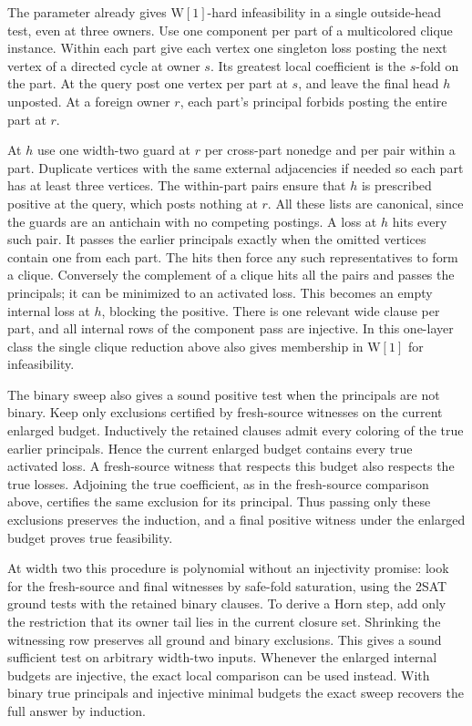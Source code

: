 The parameter already gives $\mathrm W[1]$-hard
infeasibility in a single outside-head test,
even at three owners. Use one component per
part of a multicolored clique instance. Within
each part give each vertex one singleton loss
posting the next vertex of a directed cycle at
owner $s$. Its greatest local coefficient is
the $s$-fold on the part. At the query post one
vertex per part at $s$, and leave the final head
$h$ unposted. At a foreign owner $r$, each part's
principal forbids posting the entire part at $r$.

At $h$ use one width-two guard at $r$ per cross-part
nonedge and per pair within a part. Duplicate
vertices with the same external adjacencies if
needed so each part has at least three vertices.
The within-part pairs ensure that $h$ is prescribed
positive at the query, which posts nothing at $r$.
All these lists are canonical, since the guards
are an antichain with no competing postings.
A loss at $h$ hits every such pair. It passes the
earlier principals exactly when the omitted
vertices contain one from each part. The hits
then force any such representatives to form a
clique. Conversely the complement of a clique
hits all the pairs and passes the principals;
it can be minimized to an activated loss.
This becomes an empty internal loss at $h$,
blocking the positive. There is one relevant
wide clause per part, and all internal rows of
the component pass are injective. In this
one-layer class the single clique reduction
above also gives membership in $\mathrm W[1]$
for infeasibility.

The binary sweep also gives a sound positive
test when the principals are not binary. Keep
only exclusions certified by fresh-source
witnesses on the current enlarged budget.
Inductively the retained clauses admit every
coloring of the true earlier principals. Hence
the current enlarged budget contains every true
activated loss. A fresh-source witness that
respects this budget also respects the true
losses. Adjoining the true coefficient, as in
the fresh-source comparison above, certifies
the same exclusion for its principal. Thus
passing only these exclusions preserves the
induction, and a final positive witness under
the enlarged budget proves true feasibility.

At width two this procedure is polynomial
without an injectivity promise: look for the
fresh-source and final witnesses by safe-fold
saturation, using the $2$SAT ground tests
with the retained binary clauses. To derive a
Horn step, add only the restriction that its
owner tail lies in the current closure set.
Shrinking the witnessing row preserves all
ground and binary exclusions. This gives a
sound sufficient test on arbitrary width-two
inputs. Whenever the enlarged internal budgets
are injective, the exact local comparison can
be used instead. With binary true principals
and injective minimal budgets the exact sweep
recovers the full answer by induction.

